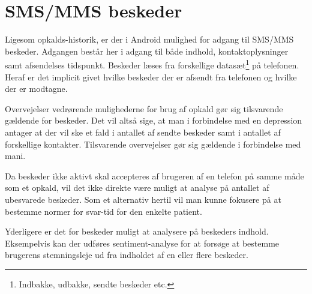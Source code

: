 \section{SMS/MMS beskeder}\label{datasamling:smsmms}
Ligesom opkalds-historik, er der i Android mulighed for adgang til SMS/MMS beskeder.
Adgangen består her i adgang til både indhold, kontaktoplysninger samt afsendelses tidspunkt.
Beskeder læses fra forskellige datasæt\footnote{Indbakke, udbakke, sendte beskeder etc.} på telefonen.
Heraf er det implicit givet hvilke beskeder der er afsendt fra telefonen og hvilke der er modtagne.

Overvejelser vedrørende mulighederne for brug af opkald gør sig tilsvarende gældende for beskeder.
Det vil altså sige, at man i forbindelse med en depression antager at der vil ske et fald i antallet af sendte beskeder samt i antallet af forskellige kontakter.
Tilsvarende overvejelser gør sig gældende i forbindelse med mani.

Da beskeder ikke aktivt skal accepteres af brugeren af en telefon på samme måde som et opkald, vil det ikke direkte være muligt at analyse på antallet af ubesvarede beskeder.
Som et alternativ hertil vil man kunne fokusere på at bestemme normer for svar-tid for den enkelte patient.

Yderligere er det for beskeder muligt at analysere på beskeders indhold.
Eksempelvis kan der udføres sentiment-analyse for at forsøge at bestemme brugerens stemningsleje ud fra indholdet af en eller flere beskeder.
